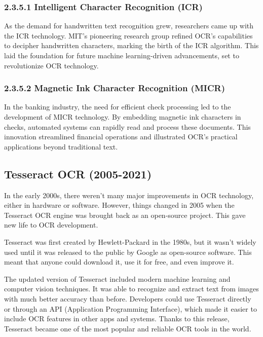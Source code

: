 \subsubsection{2.3.5.1 Intelligent Character Recognition (ICR)}
\label{sec:icr}

As the demand for handwritten text recognition grew, researchers came up with the ICR technology. 
MIT's pioneering research group refined OCR's capabilities to decipher handwritten characters, 
marking the birth of the ICR algorithm. This laid the foundation for future machine learning-driven 
advancements, set to revolutionize OCR technology.

\subsubsection{2.3.5.2 Magnetic Ink Character Recognition (MICR)}
\label{sec:micr}

In the banking industry, the need for efficient check processing led to the development 
of MICR technology. By embedding magnetic ink characters in checks, automated systems can 
rapidly read and process these documents. This innovation streamlined financial operations 
and illustrated OCR's practical applications beyond traditional text.




\subsection{Tesseract OCR (2005-2021)}
\label{sec:tesseract-ocr}
In the early 2000s, there weren’t many major improvements in OCR technology, 
either in hardware or software. However, things changed in 2005 when the Tesseract OCR 
engine was brought back as an open-source project. This gave new life to OCR development.

Tesseract was first created by Hewlett-Packard in the 1980s, but it wasn’t widely 
used until it was released to the public by Google as open-source software. 
This meant that anyone could download it, use it for free, and even improve it.

The updated version of Tesseract included modern machine learning and computer vision 
techniques. It was able to recognize and extract text from images with much better 
accuracy than before. Developers could use Tesseract  \cite{smith2007overview} directly or through an API 
(Application Programming Interface), which made it easier to include OCR features 
in other apps and systems. Thanks to this release, Tesseract became one of the 
most popular and reliable OCR tools in the world.

